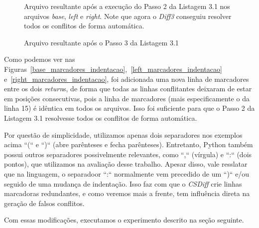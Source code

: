 \begin{figure}[ht]
	\begin{center}
		
		\caption{Arquivo resultante após a execução do Passo 2 da Listagem 3.1 nos arquivos
			\emph{base}, \emph{left} e \emph{right}. Note que agora o \emph{Diff3} conseguiu resolver todos
			os conflitos de forma automática.
		}\label{diff3_marcadores_indentacao}
	\end{center}
\end{figure}

\begin{figure}[ht]
	\begin{center}
		
		\caption{Arquivo resultante após o Passo 3 da Listagem 3.1}\label{csdiff_indentacao}
	\end{center}
\end{figure}

Como podemos ver nas
Figuras~\ref{base_marcadores_indentacao},~\ref{left_marcadores_indentacao}
e~\ref{right_marcadores_indentacao}, foi adicionada uma nova linha de
marcadores entre os dois \emph{return}s, de forma que todas as linhas
conflitantes deixaram de estar em posições consecutivas, pois a linha de
marcadores (mais especificamente o da linha 15) é idêntica em todos os
arquivos. Isso foi suficiente para que o Passo 2 da
Listagem 3.1 resolvesse todos os conflitos de forma
automática.

Por questão de simplicidade, utilizamos apenas dois separadores nos exemplos
acima ``(`` e ``)`` (abre parênteses e fecha parênteses). Entretanto, Python também possui outros separadores
possivelmente relevantes, como ``,`` (vírgula) e ``:`` (dois pontos), que
utilizamos na avaliação desse trabalho. Apesar disso, vale resslatar que na
linguagem, o separadoor ``:`` normalmente vem precedido de um ``)`` e/ou
seguido de uma mudança de indentação. Isso faz com que o \emph{CSDiff} crie
linhas marcadoras redundantes, e como veremos mais a frente, tem influência
direta na geração de falsos conflitos.

Com essas modificações, executamos o experimento descrito na seção seguinte.


